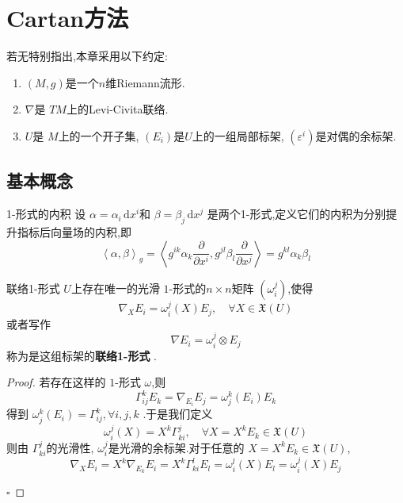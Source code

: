 \documentclass[../../main.tex]{subfiles}
\begin{document}
\chapter{ Cartan方法 }

若无特别指出,本章采用以下约定:

\begin{enumerate}
    \item \(  \left( M,g \right)   \)是一个\(  n  \)维Riemann流形.   
    \item \(   \nabla   \)是 \(  TM  \)上的Levi-Civita联络.
    \item \(  U  \)是 \(  M  \)上的一个开子集, \(  \left( E_{i} \right)   \)是\(  U  \)上的一组局部标架, \(  \left(  \varepsilon ^{i} \right)   \)是对偶的余标架.       
\end{enumerate}
\section{基本概念}

\begin{definition}{1-形式的内积}
    设 \(  \alpha = \alpha _{i}\,\mathrm{d} x^{i}  \)和 \(  \beta = \beta _{j}\,\mathrm{d} x^{j}  \)  是两个1-形式,定义它们的内积为分别提升指标后向量场的内积,即 \[
    \left<\alpha ,\beta  \right>_{g}= \left<g^{ik}\alpha _{k}\frac{\partial }{\partial x^{i}},g^{jl}\beta _{l}\frac{\partial }{\partial x^{j}} \right>=  g^{kl}\alpha _{k}\beta _{l}
    \]
\end{definition}

\begin{definition}{联络1-形式}
    \(  U  \)上存在唯一的光滑 \(  1  \)-形式的\(  n\times n  \)矩阵 \(  \left(  \omega _{i}^{j} \right)   \),使得 \[
     \nabla _{X}E_{i}=  \omega _{i}^{j}\left( X \right)E_{j},\quad \forall  X \in \mathfrak{X}\left( U \right)  
    \]或者写作 \[
     \nabla E_{i}=  \omega _{i}^{j}\otimes E_{j}
    \]称为是这组标架的\textbf{联络1-形式} .   
\end{definition}
\begin{proof}
     若存在这样的 \(  1  \)-形式 \(   \omega   \),则 \[
   \Gamma _{ij}^{k}E_{k}=    \nabla _{E_{i}}E_{j}=  \omega _{j}^{k}\left( E_{i} \right)E_{k} 
    \]  得到 \(   \omega _{j}^{k}\left( E_{i} \right)=  \Gamma _{ij}^{k},\forall i,j,k   \) .于是我们定义 \[
     \omega _{i}^{j}\left( X \right)=X^{k} \Gamma _{ki}^{j},\quad \forall X = X^{k}E_{k} \in \mathfrak{X}\left( U \right) 
    \]则由 \(   \Gamma _{ki}^{j}  \)的光滑性, \(   \omega _{i}^{j}  \)是光滑的余标架.对于任意的 \(  X =  X^{k}E_{k} \in \mathfrak{X}\left( U \right)   \), \[
     \nabla _{X}E_{i}= X^{k} \nabla _{E_{k}}E_{i}= X^{k} \Gamma _{ki}^{l}E_{l}=  \omega _{i}^{l}\left( X \right)E_{l}=  \omega _{i}^{j}\left( X \right) E_{j} 
    \]   

    \hfill $\square$
\end{proof}
\end{document}
